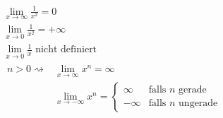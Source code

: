 \begin{bsp*}
	\begin{gather*}
		\lim_{x \rightarrow \infty} \frac{1}{x^2} = 0 \\
		\lim_{x \rightarrow 0} \frac{1}{x^2} = +\infty \\
		\lim_{x \rightarrow 0} \frac{1}{x} \text{ nicht definiert} \\
		\begin{split}
			n > 0 \rightsquigarrow	&\lim_{x \rightarrow \infty} x^n = \infty \\
								&\lim_{x \rightarrow -\infty} x^n = \begin{cases}
									\infty	&\text{falls } n \text{ gerade}	\\
									-\infty	&\text{falls } n \text{ ungerade}	
								\end{cases}
		\end{split}
	\end{gather*}
\end{bsp*}

